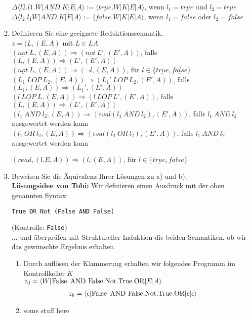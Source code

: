 \documentclass[ngerman,a4paper]{report}
\begin{document}
\begin{enumerate}
$\Delta\langle l2.l1.W|\underline{AND}.K|E|A\rangle:= \langle \underline{true}.W|K|E|A\rangle$, wenn $l_1=\underline{true}$ und $l_2=\underline{true}$\\
$\Delta\langle l_2.l_1W|\underline{AND}.K|E|A\rangle:= \langle \underline{false}.W|K|E|A\rangle$, wenn $l_1=\underline{false}$ oder $l_2=\underline{false}$\\
\item Definieren Sie eine geeignete Reduktionssemantik.\\
$z=(L, (E,A)$ mit $L \in LA$\\
$(\underline{not}\  L,(E,A)) \Rightarrow (\underline{not}\  L',(E',A))$, falls $(L,(E,A)) \Rightarrow (L',(E',A))$\\
$(\underline{not}\  L,(E,A)) \Rightarrow (\neg l,(E,A))$, für $l\in\{\underline{true},\underline{false}\}$\\

$(L_1\ \underline{LOP}\ L_2,(E,A)) \Rightarrow (L_1'\ \underline{LOP}\ L_2,(E',A))$, falls $(L_1,(E,A)) \Rightarrow (L_1',(E',A))$\\

$(l\ \underline{LOP}\ L,(E,A)) \Rightarrow (l\ \underline{LOP}\ L',(E',A))$, falls $(L,(E,A)) \Rightarrow (L',(E',A))$\\

$(l_1\ \underline{AND}\ l_2,(E,A)) \Rightarrow (eval(l_1\ \underline{AND}\ l_2),(E',A))$, falls $l_1\ \underline{AND}\ l_2$ ausgewertet werden kann
$(l_1\ \underline{OR}\ l_2,(E,A)) \Rightarrow (eval(l_1\ \underline{OR}\ l_2),(E',A))$, falls $l_1\ \underline{AND}\ l_2$ ausgewertet werden kann

$(read,(l.E,A)) \Rightarrow (l,(E,A))$, für $l\in\{\underline{true},\underline{false}\}$\\
\item Beweisen Sie die Äquivalenz Ihrer Lösungen zu a) und b).\\
\textbf{Lösungsidee von Tobi:}
Wir definieren einen Ausdruck mit der oben genannten Syntax:
\begin{lstlisting}
True OR Not (False AND False)
\end{lstlisting}
(Kontrolle: \lstinline!False!)\\
... und überprüfen mit Struktureller Induktion die beiden Semantiken, ob wir das gewünschte Ergebnis erhalten.
\begin{enumerate}
\item Durch auflösen der Klammerung erhalten wir folgendes Programm im Kontrollkeller $K$\\
$z_0=\langle W|\text{\lstinline!False AND False.Not.True.OR!}|E|A\rangle$
\begin{align*}
z_0&=\langle \epsilon|\text{\lstinline!False AND False.Not.True.OR!}|\epsilon|\epsilon\rangle
\end{align*}
\item some stuff here\\
\end{enumerate}
\end{enumerate}
\end{document}
